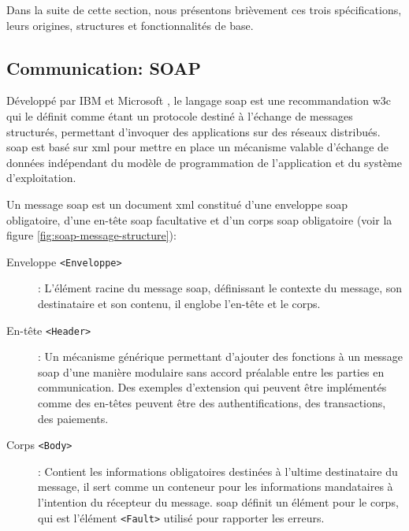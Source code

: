 

Dans la suite de cette section, nous présentons brièvement ces trois
spécifications, leurs origines, structures et fonctionnalités de base.

\newpage
  \subsection{Communication: SOAP}
  \label{sec:soap}
  Développé par IBM et Microsoft \cite{box2000simple}, le langage
  \acrshort{soap} est une recommandation \acrshort{w3c}
  \cite{mitra2003soap} qui le définit comme étant un protocole destiné
  à l'échange de messages structurés, permettant d'invoquer des
  applications sur des réseaux distribués. \acrshort{soap} est basé
  sur \acrshort{xml} pour mettre en place un mécanisme valable
  d'échange de données indépendant du modèle de programmation de
  l'application et du système d'exploitation.\medskip

  Un message \acrshort{soap} est un document \acrshort{xml} constitué
  d'une enveloppe \acrshort{soap} obligatoire, d'une en-tête
  \acrshort{soap} facultative et d'un corps \acrshort{soap} obligatoire
  (voir la figure \ref{fig:soap-message-structure}):\bigskip

  \bigskip

  \renewcommand{\descriptionlabel}[1]{\hspace{0.5cm}\textbullet~\textsf{#1}}
  \begin{description}
  \item[Enveloppe \texttt{<Enveloppe>}]: L'élément racine du message
    \acrshort{soap}, définissant le contexte du message, son
    destinataire et son contenu, il englobe l'en-tête et le corps.

  \item[En-tête \texttt{<Header>}]: Un mécanisme générique permettant
    d'ajouter des fonctions à un message \acrshort{soap} d'une manière
    modulaire sans accord préalable entre les parties en
    communication. Des exemples d'extension qui peuvent être
    implémentés comme des en-têtes peuvent être des authentifications, des
    transactions, des paiements.

  \item[Corps \texttt{<Body>}]: Contient les informations obligatoires
    destinées à l'ultime destinataire du message, il sert comme un
    conteneur pour les informations mandataires à l'intention du
    récepteur du message. \acrshort{soap} définit un élément pour le
    corps, qui est l'élément \texttt{<Fault>} utilisé pour rapporter
    les erreurs.
  \end{description}
  \enddescription

